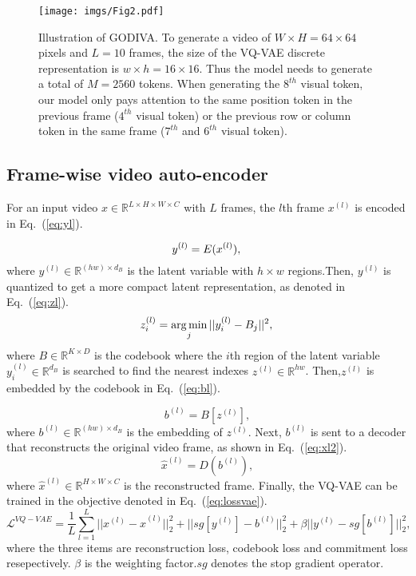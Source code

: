 \documentclass{article}
\begin{document}
\begin{figure*}[t]
	\centering
	\texttt{[image: imgs/Fig2.pdf]}
	\caption{Illustration of GODIVA. To generate a video of $W\times H=64\times 64$ pixels and  $L=10$ frames, the size of the VQ-VAE discrete representation is $w\times h=16\times 16$. Thus the model needs to generate a total of $M=2560$ tokens. When generating the $8^{th}$ visual token, our model only pays attention to the same position token in the previous frame ($4^{th}$ visual token) or the previous row or column token in the same frame ($7^{th}$ and $6^{th}$ visual token).}
	\label{fig:big}
\end{figure*}



\subsection{Frame-wise video auto-encoder} \label{sec:fva}
For an input video $x\in \mathbb{R}^{L\times H\times W\times C}$ with $L$ frames, the $l$th frame $x^{(l)}$ is encoded in Eq.~(\ref{eq:yl}).

\begin{equation} \label{eq:yl} 
y^{(l)}=E(x^{(l)}), \\
\end{equation}
where $y^{(l)}\in \mathbb{R}^{(hw)\times d_B}$ is the latent variable with $h\times w$ regions.Then, $y^{(l)}$ is quantized to get a more compact latent representation, as denoted in Eq.~(\ref{eq:zl}).
\begin{equation} \label{eq:zl} 
z^{(l)}_i=\mathop{\arg\min}_{j}||y_i^{(l)}-B_j||^2,\\
\end{equation}
where $B\in \mathbb{R}^{K\times D}$ is the codebook where the $i$th region of the latent variable $y^{(l)}_i\in \mathbb{R}^{d_B}$ is searched to find the nearest indexes $z^{(l)}\in \mathbb{R}^{hw}$. Then,$z^{(l)}$ is embedded by the codebook in Eq.~(\ref{eq:bl}).

\begin{equation} \label{eq:bl} 
b^{(l)}=B[z^{(l)}],
\end{equation}
where  $b^{(l)}\in \mathbb{R}^{(hw)\times d_B}$ is the embedding of $z^{(l)}$. Next, $b^{(l)}$ is sent to a decoder that reconstructs the original video frame, as shown in Eq.~(\ref{eq:xl2}).
\begin{equation} \label{eq:xl2} 
\hat{x}^{(l)}=D(b^{(l)}),
\end{equation}
where $\hat{x}^{(l)}\in \mathbb{R}^{H\times W\times C}$ is the reconstructed frame. Finally, the  VQ-VAE can be trained in the objective denoted in Eq.~(\ref{eq:lossvae}).
\begin{equation} \label{eq:lossvae} 
\mathscr{L}^{VQ-VAE}=\frac{1}{L}\sum_{l=1}^{L}||x^{(l)}-\hat{x}^{(l)}||_2^2+||sg[y^{(l)}]-b^{(l)}||_2^2+\beta||y^{(l)}-sg[b^{(l)}]||_2^2,
\end{equation}
where the three items are reconstruction loss, codebook loss and commitment loss resepectively. $\beta$ is the weighting factor.$sg$ denotes the stop gradient operator.
\end{document}
